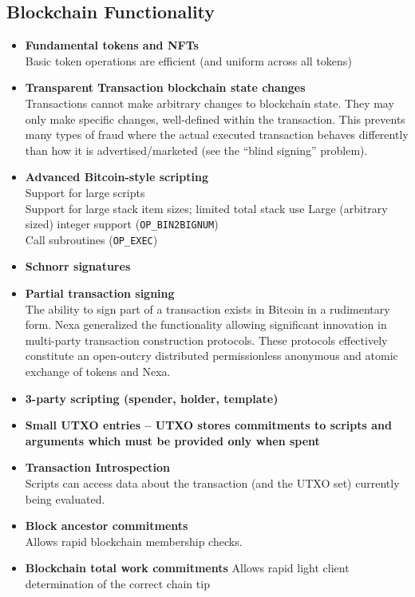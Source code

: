 \documentclass[a4paper, 11pt]{article}
\begin{document}
 \subsection{Blockchain Functionality}
 \begin{itemize}
     \item \textbf{Fundamental tokens and NFTs}\\
        Basic token operations are efficient (and uniform across all tokens)
    \item \textbf{Transparent Transaction blockchain state changes}\\
        Transactions cannot make arbitrary changes to blockchain state.  They may only make specific changes, well-defined within the transaction.  This prevents many types of fraud where the actual executed transaction behaves differently than how it is advertised/marketed (see the “blind signing” problem).
    \item \textbf{Advanced Bitcoin-style scripting}\\
        Support for large scripts\\
        Support for large stack item sizes; limited total stack use
        Large (arbitrary sized) integer support (\verb|OP_BIN2BIGNUM|)\\
        Call subroutines (\verb|OP_EXEC|)
    \item \textbf{Schnorr signatures}\\
    \item \textbf{Partial transaction signing}\\
        The ability to sign part of a transaction exists in Bitcoin in a rudimentary form.  Nexa generalized the functionality allowing significant innovation in multi-party transaction construction protocols.  These protocols effectively constitute an open-outcry distributed permissionless anonymous and atomic exchange of tokens and Nexa.
    \item \textbf{3-party scripting (spender, holder, template)}\\
    \item \textbf{Small UTXO entries – UTXO stores commitments to scripts and arguments which must be provided only when spent}\\
    \item \textbf{Transaction Introspection}\\
        Scripts can access data about the transaction (and the UTXO set) currently being evaluated.
    \item \textbf{Block ancestor commitments}\\
		Allows rapid blockchain membership checks.
    \item \textbf{Blockchain total work commitments}
        Allows rapid light client determination of the correct chain tip
 \end{itemize}
\end{document}
